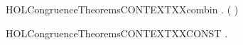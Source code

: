 \newcommand{\HOLCongruenceTheoremsCONTEXTXXcases}{\UseVerbatim{HOLCongruenceTheoremsCONTEXTXXcases}}
\begin{SaveVerbatim}{HOLCongruenceTheoremsCONTEXTXXcombin}
\HOLTokenTurnstile{} \HOLSymConst{\HOLTokenForall{}} .   \HOLSymConst{\HOLTokenConj{}}   \HOLSymConst{\HOLTokenImp{}}  ( \HOLConst{\HOLTokenCompose} )
\end{SaveVerbatim}
\newcommand{\HOLCongruenceTheoremsCONTEXTXXcombin}{\UseVerbatim{HOLCongruenceTheoremsCONTEXTXXcombin}}
\begin{SaveVerbatim}{HOLCongruenceTheoremsCONTEXTXXCONST}
\HOLTokenTurnstile{} \HOLSymConst{\HOLTokenForall{}}.   \HOLSymConst{\HOLTokenImp{}}  
\end{SaveVerbatim}
\newcommand{\HOLCongruenceTheoremsCONTEXTXXCONST}{\UseVerbatim{HOLCongruenceTheoremsCONTEXTXXCONST}}

